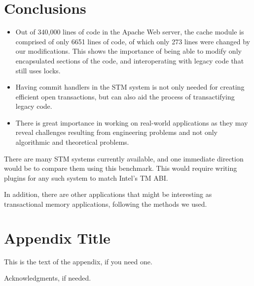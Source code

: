 \documentclass[preprint,natbib,11pt]{sigplanconf}
\begin{document}
\section{Conclusions}
\begin{itemize}
  \item Out of 340,000 lines of code in the Apache Web server, the cache module is comprised of only 6651 lines of code, of which only 273 lines were changed by our modifications. This shows the importance of being able to modify only encapsulated sections of the code, and interoperating with legacy code that still uses locks.  
  \item Having commit handlers in the STM system is not only needed for creating efficient open transactions, but can also aid the process of transactifying legacy code.
  \item There is great importance in working on real-world applications as they may reveal challenges resulting from engineering problems and not only algorithmic and theoretical problems.
\end{itemize}
There are many STM systems currently available, and one immediate direction would be to compare them using this benchmark. This would require writing plugins for any such system to match Intel's TM ABI. 

In addition, there are other applications that might be interesting as transactional memory applications, following the methods we used.

\appendix
\section{Appendix Title}

This is the text of the appendix, if you need one.

\acks

Acknowledgments, if needed.



%
%


\end{document}
